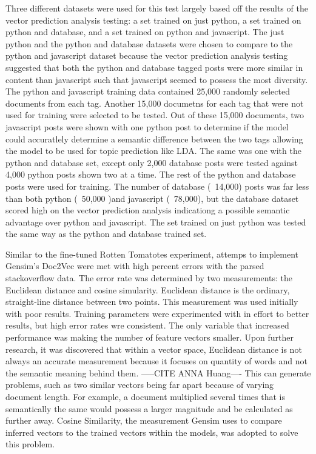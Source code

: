 Three different datasets were used for this test largely based off the results of the vector prediction analysis testing: a set trained on just python, a set trained on python and database, and a set trained on python and javascript. The just python and the python and database datasets were chosen to compare to the python and javascript dataset because the vector prediction analysis testing suggested that both the python and database tagged posts were more similar in content than javascript such that javascript seemed to possess the most diversity. The python and javascript training data contained 25,000 randomly selected documents from each tag. Another 15,000 documetns for each tag that were not used for training were selected to be tested. Out of these 15,000 documents, two javascript posts were shown with one python post to determine if the model could accuratlely determine a semantic difference between the two tags allowing the model to be used for topic prediction like LDA. The same was one with the python and database set, except only 2,000 database posts were tested against 4,000 python posts shown two at a time. The rest of the python and database posts were used for training. The number of database (~14,000) posts was far less than both python (~50,000 )and javascript (~78,000), but the database dataset scored high on the vector prediction analysis indicationg a possible semantic advantage over python and javascript. The set trained on just python was tested the same way as the python and database trained set.

Similar to the fine-tuned Rotten Tomatotes experiment, attemps to implement Gensim's Doc2Vec were met with high percent errors with the parsed stackoverflow data. The error rate was determined by two measurements: the Euclidean distance and cosine simularity. Euclidean distance is the ordinary, straight-line distance between two points. This measurement was used initially with poor results. Training parameters were experimented with in effort to better results, but high error rates wre consistent. The only variable that increased performance was making the number of feature vectors smaller. Upon further research, it was discovered that within a vector space, Euclidean distance is not always an accurate measurement because it focuses on quantity of words and not the semantic meaning behind them. -----CITE ANNA Huang---- This can generate problems, such as two similar vectors being far apart because of varying document length. For example, a document multiplied several times that is semantically the same would possess a larger magnitude and be calculated as further away. Cosine Similarity, the measurement Gensim uses to compare inferred vectors to the trained vectors within the models, was adopted to solve this problem.

